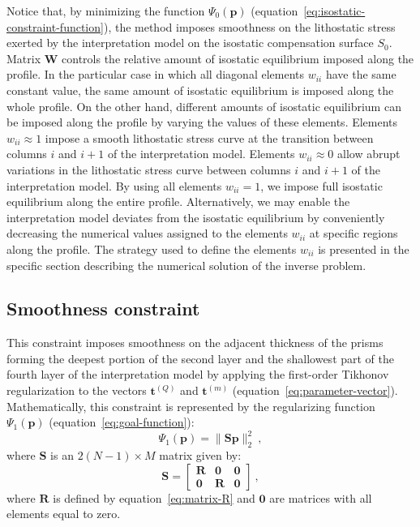 \documentclass[manuscript]{geophysics}
\begin{document}
Notice that, by minimizing the function $\Psi_{0}(\mathbf{p})$ 
(equation~\ref{eq:isostatic-constraint-function}), the method imposes smoothness on 
the lithostatic stress exerted by the interpretation model on the isostatic 
compensation surface $S_{0}$.
Matrix $\mathbf{W}$ controls the relative amount of isostatic equilibrium imposed 
along the profile. 
In the particular case in which all diagonal elements $w_{ii}$ have the same
constant value, the same amount of isostatic equilibrium is imposed along the 
whole profile. On the other hand, different amounts of isostatic equilibrium
can be imposed along the profile by varying the values of these elements.
Elements $w_{ii} \approx 1$ impose a smooth lithostatic stress curve 
at the transition between columns $i$ and $i+1$ of the interpretation model.
Elements $w_{ii} \approx 0$ allow abrupt variations in the lithostatic stress 
curve between columns $i$ and $i+1$ of the interpretation model.
By using all elements $w_{ii} = 1$, we impose full isostatic equilibrium 
along the entire profile. Alternatively, we may enable the interpretation model 
deviates from the isostatic equilibrium by conveniently decreasing the numerical values
assigned to the elements $w_{ii}$ at specific regions along the profile. 
The strategy used to define the elements $w_{ii}$ is 
presented in the specific section describing the numerical solution of the inverse problem.


\subsection{Smoothness constraint}


This constraint imposes smoothness on the adjacent thickness of the prisms forming the
deepest portion of the second layer and the shallowest part of the fourth layer
of the interpretation model by applying the first-order Tikhonov regularization
\citep{aster-etal2005} to the vectors $\mathbf{t}^{(Q)}$ and $\mathbf{t}^{(m)}$ 
(equation~\ref{eq:parameter-vector}). 
Mathematically, this constraint is represented by the regularizing function
$\Psi_{1}(\mathbf{p})$ (equation~\ref{eq:goal-function}):
\begin{equation}
\Psi_{1}(\mathbf{p}) = \| \mathbf{S}\mathbf{p} \|_{2}^{2} \: ,
\label{eq:smootheness-contraint}
\end{equation}
where $\mathbf{S}$ is an $2 \left( N-1 \right) \times M$ matrix given by:
\begin{equation}
\mathbf{S} = \begin{bmatrix}
\mathbf{R} & \mathbf{0} & \mathbf{0} \\
\mathbf{0} & \mathbf{R} & \mathbf{0}
\end{bmatrix} \: ,
\label{eq:matrix-S}
\end{equation}
where $\mathbf{R}$ is defined by equation~\ref{eq:matrix-R} and $\mathbf{0}$
are matrices with all elements equal to zero.
\end{document}
